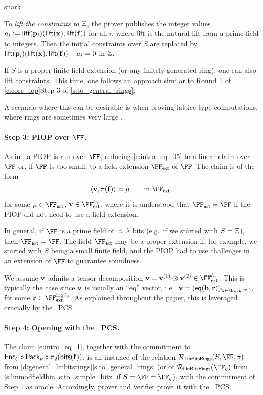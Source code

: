 \begin{lncsappendix}{snark}
\begin{remark}
    To \emph{lift the constraints to $\mathbb{Z}$}, the prover publishes the integer values $a_i{\;\vcentcolon=\;} \mathsf{lift}(\mathbf{p}_i)(\mathsf{lift}(\mathbf{x}),\mathsf{lift}(\mathbf{f}))$  for all $i$, where $\mathsf{lift}$ is the natural lift from a prime field to integers. Then the initial constraints over $S$ are replaced by $\mathsf{lift}(\mathbf{p}_i)(\mathsf{lift}(\mathbf{x}),\mathsf{lift}(\mathbf{f}))-a_i = 0$ in $\mathbb{Z}$.

If $S$ is a proper finite field extension (or any finitely generated ring), one can also lift constraints. This time, one follows an approach similar to \iflncs Round 1 of \cref{c:core_iop}\else Step 3 of \cref{s:to_general_rings}\fi.

A scenario where this can be desirable is when proving lattice-type computations, where rings are sometimes very large \cite{ckks}.
\end{remark}

     \paragraph{Step 3: PIOP over $\FF$.} As in \cite{zaratan,zincplus,limber}, a PIOP is run over $\FF$, reducing \eqref{e:intro_eq_05} to a linear claim over $\FF$ or, if $\FF$ is too small, to a field extension  $\FFext$ of $\FF$.  The claim is  of the form
\begin{equation}\label{e:intro_eq_1}
\langle \vv, \pi(\bff)\rangle =\mu \qquad \text{in } \FFext,
\end{equation}
for some $\mu\in\FFext$, $\vv\in \FFext^{\codedim_0}$, where it is understood that $\FFext=\FF$ if the PIOP did not need to use a field extension. 

In general, if $\FF$ is a prime field of $\approx \lambda$ bits (e.g.\ if we started with $S=\mathbb{Z}$), then $\FFext=\FF$. The field $\FFext$ may be a proper extension if, for example, we started with $S$ being a small finite field,  and the PIOP had to use challenges in an extension of $\FF$ to guarantee soundness.
 
We  assume $\mathbf{v}$ admits a tensor decomposition $\vv=\vv^{(1)} \otimes \vv^{(2)} \in \FFext^{\codedim_0}$. This is typically the case since $\mathbf{v}$ is usually an ``eq'' vector, i.e.\ $\vv=(\eq(\bb,\rr))_{\bb\in \bits^{\log \codedim_0}}$ for some $\rr\in \FFext^{\log\codedim_0}$. As explained throughout the paper, this is leveraged crucially by the \ftwoz\ PCS.


\paragraph{Step 4: Opening with the \ftwoz\ PCS.} The claim \eqref{e:intro_eq_1}, together with the commitment to $\mathsf{Enc}_{\mathcal{C}} \circ \mathsf{Pack}_\nu \circ \pi_2(\mathsf{bits}(\mathbf{f}))$, is an instance of the relation $\LinModFieldBin(S,\FF,\pi)$ from \iflncs\cref{d:general_linbitsrings}\else\cref{s:to_general_rings}\fi{} (or of $\LinModFieldBin(\FF_q)$ from \iflncs\cref{s:linmodfieldbin}\else\cref{s:to_simple_bitz}\fi{} if $S=\FF=\FF_q$), with the commitment of Step 1 as oracle. Accordingly, prover and verifier prove it with the \ftwoz\ PCS.



\end{lncsappendix}
